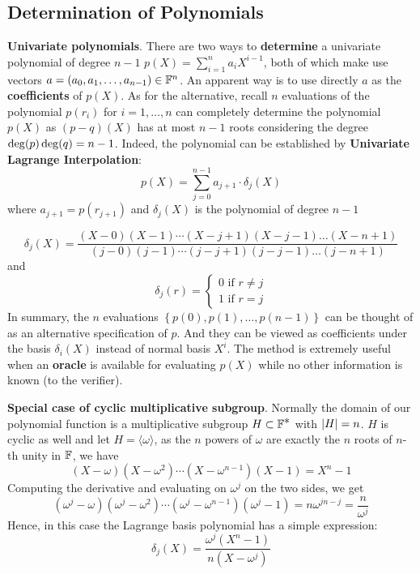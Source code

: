 \documentclass{article}
\begin{document}
\subsection{Determination of Polynomials}

\textbf{Univariate polynomials}. There are two ways to \textbf{determine} a univariate polynomial of degree $n-1$  $p(X) = \sum_{i = 1}^n a_i X^{i-1}$, both of which make use vectors $a = (a_0, a_1, \dots, a_{n-1}) \in \mathbb{F}^n$. An apparent way is to use directly $a$ as the \textbf{coefficients} of $p(X)$. As for the alternative, recall $n$ evaluations of the polynomial $p(r_i)$ for $i = 1, \dots, n$ can completely determine the polynomial $p(X)$ as $(p -  q)(X)$ has at most $n-1$ roots considering the degree $\operatorname{deg}(p) \operatorname{deg}(q) = n-1$. Indeed, the polynomial can be established by \textbf{Univariate Lagrange Interpolation}:
\begin{equation} \label{eq:univariate-lagrange}
p(X) = \sum_{j = 0}^{n-1} a_{j+1} \cdot \delta_{j}(X)
\end{equation}
where $a_{j+1} = p(r_{j+1})$ and $\delta_j(X)$ is the polynomial of degree $n-1$

\begin{equation*}
\delta_j(X) = \frac{(X-0)(X-1) \cdots (X-j+1) (X - j - 1) \dots (X - n+1)}{(j-0)(j-1) \cdots (j-j+1) (j - j - 1) \dots (j - n+1)}
\end{equation*}
and
\[
\delta_j(r) = 
\begin{cases}
0 \text{ if } r \neq j \\
1 \text{ if } r = j
\end{cases}
\]
In summary, the $n$ evaluations $\left\{ p(0), p(1), \dots, p(n-1) \right\}$ can be thought of as an alternative specification of $p$. And they can be viewed as coefficients under the basis $\delta_i(X)$ instead of normal basis $X^i$. The method is extremely useful when an \textbf{oracle} is available for evaluating $p(X)$ while no other information is known (to the verifier). 

\textbf{Special case of cyclic multiplicative subgroup}. Normally the domain of our polynomial function is a multiplicative subgroup $H \subset \mathbb{F}^{\displaystyle *}$ with $\abs{H} = n$. $H$ is cyclic as well and let $H = \langle \omega \rangle$, as the $n$ powers of $\omega$ are exactly the $n$ roots of $n$-th unity in $\mathbb{F}$, we have
\begin{equation*}
\left( X - \omega \right) \left( X - \omega^2 \right) \cdots \left( X - \omega^{n-1} \right) \left( X - 1 \right) = X^n - 1
\end{equation*}
Computing the derivative and evaluating on $\omega^{j}$ on the two sides, we get
\begin{equation*}
\left( \omega^{j} - \omega \right) \left( \omega^{j} - \omega^2 \right) \cdots \left( \omega^{j} - \omega^{n-1} \right) \left( \omega^{j} - 1 \right) = n \omega^{jn - j} = \frac{n}{\omega^j}
\end{equation*}
Hence, in this case the Lagrange basis polynomial has a simple expression:
\begin{equation*}
\delta_j(X) = \frac{\omega^j (X^n - 1)}{ n (X - \omega^j)}
\end{equation*}
\end{document}

